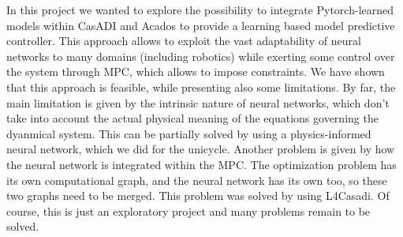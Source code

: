 In this project we wanted to explore the possibility to integrate
Pytorch-learned models within CasADI and Acados to provide a learning based
model predictive controller. This approach allows to exploit the vast
adaptability of neural networks to many domains (including robotics) while
exerting some control over the system through MPC, which allows to impose
constraints. We have shown that this approach is feasible, while presenting
also some limitations. By far, the main limitation is given by the
intrinsic nature of neural networks, which don't take into account the
actual physical meaning of the equations governing the dyanmical system.
This can be partially solved by using a physics-informed neural network,
which we did for the unicycle. Another problem is given by how the neural
network is integrated within the MPC. The optimization problem has its own
computational graph, and the neural network has its own too, so these two
graphs need to be merged. This problem was solved by using L4Casadi. Of
course, this is just an exploratory project and many problems remain to be
solved.